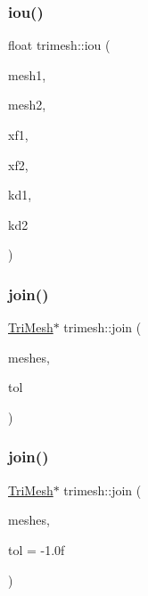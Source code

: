 \mbox{\label{namespacetrimesh_a0cc5429c6b69538825fc7e9975cccc03}} 
\subsubsection{\texorpdfstring{iou()}{iou()}\hspace{0.1cm}{\footnotesize\ttfamily [3/3]}}
{\footnotesize\ttfamily float trimesh\+::iou (\begin{DoxyParamCaption}\item[{\hyperlink{classtrimesh_1_1TriMesh}{Tri\+Mesh} $\ast$}]{mesh1,  }\item[{\hyperlink{classtrimesh_1_1TriMesh}{Tri\+Mesh} $\ast$}]{mesh2,  }\item[{const \hyperlink{namespacetrimesh_ad504958f2f56e393991b848986a8459f}{xform} \&}]{xf1,  }\item[{const \hyperlink{namespacetrimesh_ad504958f2f56e393991b848986a8459f}{xform} \&}]{xf2,  }\item[{const \hyperlink{classtrimesh_1_1KDtree}{K\+Dtree} $\ast$}]{kd1,  }\item[{const \hyperlink{classtrimesh_1_1KDtree}{K\+Dtree} $\ast$}]{kd2 }\end{DoxyParamCaption})}

\mbox{\label{namespacetrimesh_a19764235e2e82cb240b257b5387a8aad}} 
\subsubsection{\texorpdfstring{join()}{join()}\hspace{0.1cm}{\footnotesize\ttfamily [1/2]}}
{\footnotesize\ttfamily \hyperlink{classtrimesh_1_1TriMesh}{Tri\+Mesh}$\ast$ trimesh\+::join (\begin{DoxyParamCaption}\item[{const vector$<$ \hyperlink{classtrimesh_1_1TriMesh}{Tri\+Mesh} $\ast$$>$ \&}]{meshes,  }\item[{float}]{tol }\end{DoxyParamCaption})}

\mbox{\label{namespacetrimesh_ae92a4fbee942b06b47f12ce9fc65f14b}} 
\subsubsection{\texorpdfstring{join()}{join()}\hspace{0.1cm}{\footnotesize\ttfamily [2/2]}}
{\footnotesize\ttfamily \hyperlink{classtrimesh_1_1TriMesh}{Tri\+Mesh}$\ast$ trimesh\+::join (\begin{DoxyParamCaption}\item[{const \+::std\+::vector$<$ \hyperlink{classtrimesh_1_1TriMesh}{Tri\+Mesh} $\ast$$>$ \&}]{meshes,  }\item[{float}]{tol = {\ttfamily -\/1.0f} }\end{DoxyParamCaption})}

